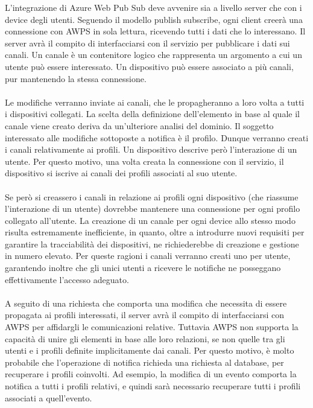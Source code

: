 L'integrazione di Azure Web Pub Sub deve avvenire
sia a livello server che con i device degli utenti. 
Seguendo il modello publish subscribe, ogni client creerà una connessione con AWPS in sola lettura, 
ricevendo tutti i dati che lo interessano. 
Il server avrà il compito di interfacciarsi con il servizio 
per pubblicare i dati sui canali.
Un canale è un contenitore logico che rappresenta 
un argomento a cui un utente può essere interessato.
Un dispositivo può essere associato a più canali, 
pur mantenendo la stessa connessione.\\
\\
Le modifiche verranno inviate ai canali,
che le propagheranno a loro volta a tutti i dispositivi collegati. 
La scelta della definizione dell'elemento in base al quale il canale viene creato 
deriva da un'ulteriore analisi del dominio. 
Il soggetto interessato alle modifiche sottoposte a notifica è il profilo.
Dunque verranno creati i canali relativamente ai profili.
Un dispositivo descrive però l'interazione di un utente.
Per questo motivo, una volta creata la connessione con il servizio,
il dispositivo si iscrive ai canali dei profili associati al suo utente.\\
\\
Se però si creassero i canali in relazione ai profili ogni dispositivo 
(che riassume l'interazione di un utente) dovrebbe mantenere una connessione per ogni profilo collegato all'utente. 
La creazione di un canale per ogni device allo stesso modo risulta estremamente inefficiente, 
in quanto, oltre a introdurre nuovi requisiti per garantire la tracciabilità dei dispositivi, 
ne richiederebbe di creazione e gestione in numero elevato. 
Per queste ragioni i canali verranno creati uno per utente, 
garantendo inoltre che gli unici utenti a ricevere 
le notifiche ne posseggano effettivamente l'accesso adeguato.\\
\\
A seguito di una richiesta che comporta una modifica
che necessita di essere propagata ai profili interessati,
il server avrà il compito di interfacciarsi con AWPS per affidargli le comunicazioni relative. 
Tuttavia AWPS non supporta la capacità di unire gli elementi in base alle loro relazioni, 
se non quelle tra gli utenti e i profili definite implicitamente dai canali. 
Per questo motivo, è molto probabile che l'operazione di notifica richieda una richiesta al database, 
per recuperare i profili coinvolti.
Ad esempio, la modifica di un evento comporta la notifica a tutti i profili relativi, 
e quindi sarà necessario recuperare tutti i profili associati a quell'evento.\\
